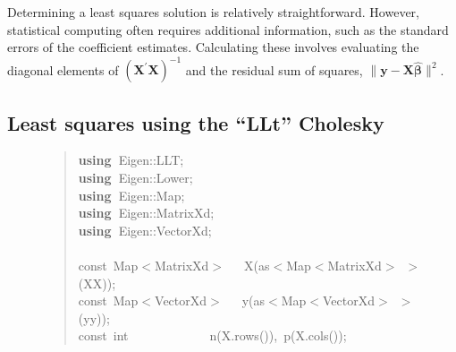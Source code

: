 \documentclass[shortnames,article]{jss}
\newcommand{\hlstd}[1]{\textcolor[rgb]{0,0,0}{#1}}
\newcommand{\hlopt}[1]{\textcolor[rgb]{0,0,0}{#1}}
\newcommand{\hlkwa}[1]{\textcolor[rgb]{0.61,0.13,0.93}{\bf{#1}}}
\newcommand{\hlkwb}[1]{\textcolor[rgb]{0.13,0.54,0.13}{#1}}
\newcommand{\hlkwd}[1]{\textcolor[rgb]{0,0,0}{#1}}
\begin{document}
Determining a least squares solution is relatively straightforward.
However, statistical computing often requires additional information,
such as the standard errors of the coefficient estimates.  Calculating
these involves evaluating the diagonal elements of $\left(\bm
  X^\prime\bm X\right)^{-1}$ and the residual sum of squares, $\|\bm
y-\bm X\widehat{\bm\beta}\|^2$.

\subsection{Least squares using the ``LLt'' Cholesky}
\label{sec:LLtLeastSquares}

\begin{figure}[tbh]
  \begin{quote}
    \noindent
    \ttfamily
    \hlstd{}\hlkwa{using\ }\hlstd{Eigen}\hlopt{::}\hlstd{LLT}\hlopt{;}\hspace*{\fill}\\
    \hlstd{}\hlkwa{using\ }\hlstd{Eigen}\hlopt{::}\hlstd{Lower}\hlopt{;}\hspace*{\fill}\\
    \hlstd{}\hlkwa{using\ }\hlstd{Eigen}\hlopt{::}\hlstd{Map}\hlopt{;}\hspace*{\fill}\\
    \hlstd{}\hlkwa{using\ }\hlstd{Eigen}\hlopt{::}\hlstd{MatrixXd}\hlopt{;}\hspace*{\fill}\\
    \hlstd{}\hlkwa{using\ }\hlstd{Eigen}\hlopt{::}\hlstd{VectorXd}\hlopt{;}\hspace*{\fill}\\
    \hlstd{}\hspace*{\fill}\\
    \hlkwb{const\ }\hlstd{Map}\hlopt{$<$}\hlstd{MatrixXd}\hlopt{$>$}\hlstd{\ \ \ }\hlopt{}\hlstd{}\hlkwd{X}\hlstd{}\hlopt{(}\hlstd{as}\hlopt{$<$}\hlstd{Map}\hlopt{$<$}\hlstd{MatrixXd}\hlopt{$>$\ $>$(}\hlstd{XX}\hlopt{));}\hspace*{\fill}\\
    \hlstd{}\hlkwb{const\ }\hlstd{Map}\hlopt{$<$}\hlstd{VectorXd}\hlopt{$>$}\hlstd{\ \ \ }\hlopt{}\hlstd{}\hlkwd{y}\hlstd{}\hlopt{(}\hlstd{as}\hlopt{$<$}\hlstd{Map}\hlopt{$<$}\hlstd{VectorXd}\hlopt{$>$\ $>$(}\hlstd{yy}\hlopt{));}\hspace*{\fill}\\
    \hlstd{}\hlkwb{const\ int}\hlstd{\ \ \ \ \ \ \ \ \ \ \ \ \ }\hlkwb{}\hlstd{}\hlkwd{n}\hlstd{}\hlopt{(}\hlstd{X}\hlopt{.}\hlstd{}\hlkwd{rows}\hlstd{}\hlopt{()),\ }\hlstd{}\hlkwd{p}\hlstd{}\hlopt{(}\hlstd{X}\hlopt{.}\hlstd{}\hlkwd{cols}\hlstd{}\hlopt{());}\hspace*{\fill}\\

\end{quote}
\end{figure}
\end{document}

